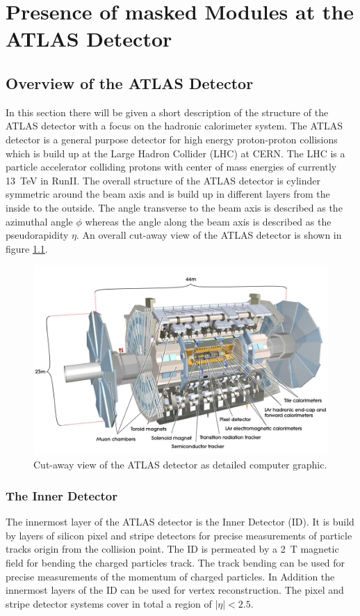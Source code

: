 \chapter{Presence of masked Modules at the ATLAS Detector}%

\section{Overview of the ATLAS Detector}

In this section there will be given a short description of the structure of the ATLAS detector with a focus on the hadronic calorimeter system.
The ATLAS detector is a general purpose detector for high energy proton-proton collisions which is build up at the Large Hadron Collider (LHC) at CERN.
The LHC is a particle accelerator colliding protons with center of mass energies of currently \SI{13}{\tera\electronvolt} in RunII.
The overall structure of the ATLAS detector is cylinder symmetric around the beam axis and is build up in different layers from the inside to the outside.
The angle transverse to the beam axis is described as the azimuthal angle $\phi$ whereas the angle along the beam axis is described as the pseudorapidity $\eta$.
An overall cut-away view of the ATLAS detector is shown in figure \ref{ATLAS}.
\begin{figure}[H]
	\centering
	\includegraphics[width=\textwidth]{./Plots/figures_AtlasDetectorLabelled.png}
	\caption{Cut-away view of the ATLAS detector as detailed computer graphic.\cite{Aad:2008zzm}}
	\label{ATLAS}
\end{figure}
\subsection{The Inner Detector}
The innermost layer of the ATLAS detector is the Inner Detector (ID).
It is build by layers of silicon pixel and stripe detectors for precise measurements of particle tracks origin from the collision point.
The ID is permeated by a \SI{2}{\tesla} magnetic field for bending the charged particles track.
The track bending can be used for precise measurements of the momentum of charged particles.
In Addition the innermost layers of the ID can be used for vertex reconstruction.
The pixel and stripe detector systems cover in total a region of $|\eta| < 2.5$.
